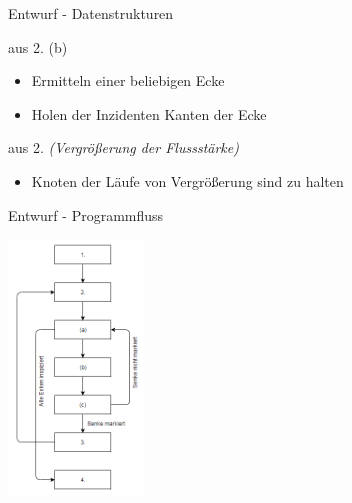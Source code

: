 \documentclass{beamer}
\begin{document}
    \begin{frame}{Entwurf - Datenstrukturen}
        \begin{block}{aus 2. (b)}
            \begin{itemize}
                \item Ermitteln einer beliebigen Ecke
                \item Holen der Inzidenten Kanten der Ecke
            \end{itemize}
        \end{block}

        \begin{block}{aus 2. \textit{(Vergr\"o\ss{}erung der Flussst\"arke)}}
            \begin{itemize}
                \item Knoten der L\"aufe von Vergr\"o\ss{}erung sind zu halten
            \end{itemize}
        \end{block}
    \end{frame}

    \begin{frame}{Entwurf - Programmfluss}
        \begin{center}
            \includegraphics[width=3.6cm]{../fordfulkerson.PNG}
        \end{center}
    \end{frame}
\end{document}
